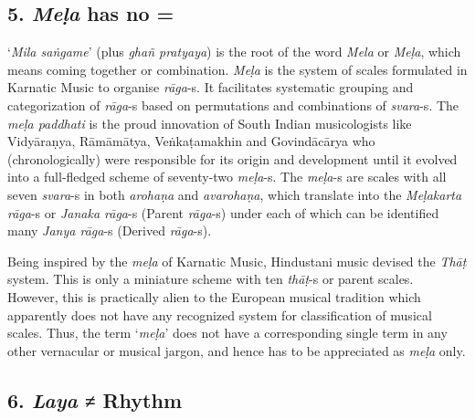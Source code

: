 \subsection*{5. \textit{Meḷa} has no =}

`\textit{Mila saṅgame}’ (plus \textit{ghañ pratyaya}) is the root of the word \textit{Mela} or \textit{Meḷa}, which means coming together or combination. \textit{Meḷa} is the system of scales formulated in Karnatic Music to organise \textit{rāga}-s. It facilitates systematic grouping and categorization of \textit{rāga}-s based on permutations and combinations of \textit{svara}-s. The \textit{meḷa paddhati} is the proud innovation of South Indian musicologists like Vidyāraṇya, Rāmāmātya, Veṅkaṭamakhin and Govindācārya who (chronologically) were responsible for its origin and development until it evolved into a full-fledged scheme of seventy-two \textit{meḷa}-s. The \textit{meḷa}-s are scales with all seven \textit{svara}-s in both \textit{arohaṇa} and \textit{avarohaṇa}, which translate into the \textit{Meḷakarta rāga}-s or \textit{Janaka rāga}-s (Parent \textit{rāga}-s) under each of which can be identified many \textit{Janya rāga}-s (Derived \textit{rāga}-s).

Being inspired by the \textit{meḷa} of Karnatic Music, Hindustani music devised the \textit{Thāṭ} system. This is only a miniature scheme with ten \textit{thāṭ}-s or parent scales. However, this is practically alien to the European musical tradition which apparently does not have any recognized system for classification of musical scales. Thus, the term ‘\textit{meḷa}’ does not have a corresponding single term in any other vernacular or musical jargon, and hence has to be appreciated as \textit{meḷa} only.


\subsection*{6. \textit{Laya} ≠ Rhythm}

